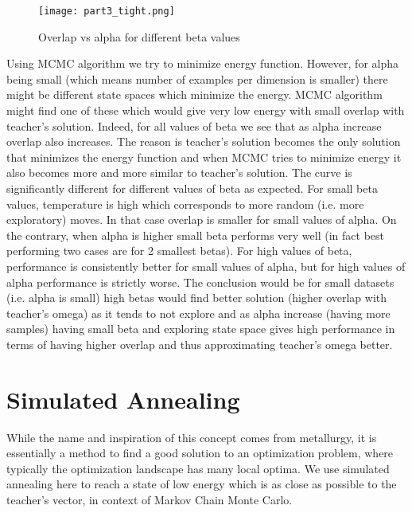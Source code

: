\documentclass[a4paper]{article}
\begin{document}
\begin{figure}[H]
\centering
\texttt{[image: part3\_tight.png]}
\caption{\label{fig:part3}Overlap vs alpha for different beta values}
\end{figure}

Using MCMC algorithm we try to minimize energy function. However, for alpha being small (which means number of examples per dimension is smaller) there might be different state spaces which minimize the energy. MCMC algorithm might find one of these which would give very low energy with small overlap with teacher's solution. Indeed, for all values of beta we see that as alpha increase overlap also increases. The reason is teacher's solution becomes the only solution that minimizes the energy function and when MCMC tries to minimize energy it also becomes more and more similar to teacher's solution. The curve is significantly different for different values of beta as expected. For small beta values, temperature is high which corresponds to more random (i.e. more exploratory) moves. In that case overlap is smaller for small values of alpha. On the contrary, when alpha is higher small beta performs very well (in fact best performing two cases are for 2 smallest betas). For high values of beta, performance is consistently better for small values of alpha, but for high values of alpha performance is strictly worse. The conclusion would be for small datasets (i.e. alpha is small) high betas would find better solution (higher overlap with teacher's omega) as it tends to not explore and as alpha increase (having more samples) having small beta and exploring state space gives high performance in terms of having higher overlap and thus approximating teacher's omega better.

\newpage
\section{Simulated Annealing}
While the name and inspiration of this concept comes from metallurgy, it is essentially a method to find a good solution to an optimization problem, where typically the optimization landscape has many local optima. We use simulated annealing here to reach a state of low energy which is as close as possible to the teacher's vector, in context of Markov Chain Monte Carlo.
\end{document}
